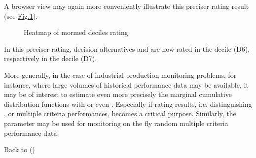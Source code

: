 \documentclass[a4paper,10pt,english]{sphinxhowto}
\let\sphinxpxdimen\pdfpxdimen\else\newdimen\sphinxpxdimen
\begin{document}
A browser view may again more conveniently illustrate this preciser  rating result (see \hyperref[\detokenize{tutorial:heatmap2}]{Fig.\@ \ref{\detokenize{tutorial:heatmap2}}}).

\begin{sphinxVerbatim}[commandchars=\\\{\},numbers=left,firstnumber=1,stepnumber=1]
\PYGZbs{}
                           
\end{sphinxVerbatim}

\begin{figure}[htbp]
\centering
\capstart

\noindent\sphinxincludegraphics[width=400\sphinxpxdimen]{{heatMap2}.png}
\caption{Heatmap of mormed deciles rating}\label{\detokenize{tutorial:heatmap2}}\end{figure}

In this preciser  rating, decision alternatives  and  are now rated in the  decile (D6), respectively in the  decile (D7).

More generally, in the case of industrial production monitoring problems, for instance, where large volumes of historical performance data may be available, it may be of interest to estimate even more precisely the marginal cumulative distribution functions with  or even . Especially if  rating results, i.e. distinguishing , or  multiple criteria performances, becomes a critical purpose. Similarly, the  parameter may be used for monitoring on the fly  random multiple criteria performance data.

Back to {\hyperref[\detokenize{tutorial:tutorial-label}]{}} ()
\end{document}
